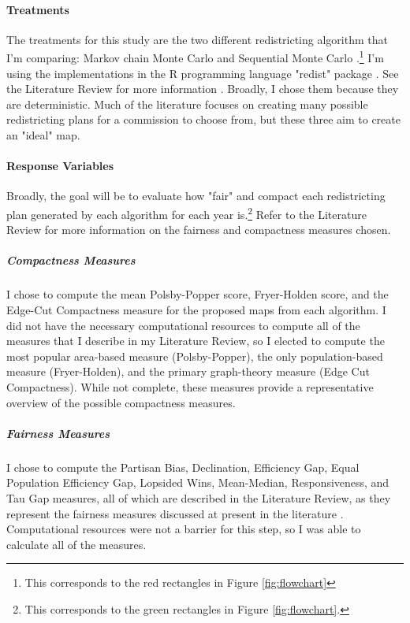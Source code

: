 \paragraph{Treatments}

The treatments for this study are the two different redistricting algorithm that I'm comparing: Markov chain Monte Carlo \parencite{fifield2020} and Sequential Monte Carlo \parencite{mccartan2020}.\footnote{This corresponds to the red rectangles in Figure \ref{fig:flowchart}} I'm using the implementations in the R programming language "redist" package \parencite{fifield2020d}. See the Literature Review for more information . Broadly, I chose them because they are deterministic. Much of the literature focuses on creating many possible redistricting plans for a commission to choose from, but these three aim to create an "ideal" map. 

\paragraph{Response Variables}

Broadly, the goal will be to evaluate how "fair" and compact each redistricting plan generated by each algorithm for each year is.\footnote{This corresponds to the green rectangles in Figure \ref{fig:flowchart}.} Refer to the Literature Review for more information on the fairness and compactness measures chosen.

\subparagraph{Compactness Measures}

I chose to compute the mean Polsby-Popper score, Fryer-Holden score, and the Edge-Cut Compactness measure for the proposed maps from each algorithm. I did not have the necessary computational resources to compute all of the measures that I describe in my Literature Review, so I elected to compute the most popular area-based measure (Polsby-Popper), the only population-based measure (Fryer-Holden), and the primary graph-theory measure (Edge Cut Compactness). While not complete, these measures provide a representative overview of the possible compactness measures. 

\subparagraph{Fairness Measures}

I chose to compute the Partisan Bias, Declination, Efficiency Gap, Equal Population Efficiency Gap, Lopsided Wins, Mean-Median, Responsiveness, and Tau Gap measures, all of which are described in the Literature Review, as they represent the fairness measures discussed at present in the literature \parencite{katz2020}. Computational resources were not a barrier for this step, so I was able to calculate all of the measures. 

